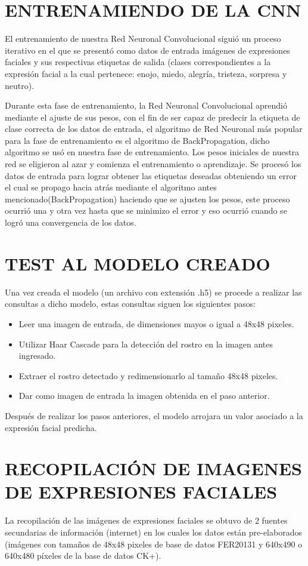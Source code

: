 \section{ENTRENAMIENDO DE LA CNN}
El entrenamiento de nuestra Red Neuronal Convolucional siguió un proceso
iterativo en el que se presentó como datos de entrada imágenes de expresiones faciales y
sus respectivas etiquetas de salida (clases correspondientes a la expresión facial a la cual
pertenece: enojo, miedo, alegría, tristeza, sorpresa y neutro).

Durante esta fase de entrenamiento, la Red Neuronal Convolucional aprendió
mediante el ajuste de sus pesos, con el fin de ser capaz de predecir la etiqueta de clase
correcta de los datos de entrada, el algoritmo de Red Neuronal más popular para la fase
de entrenamiento es el algoritmo de BackPropagation, dicho algoritmo se usó en nuestra
fase de entrenamiento. Los pesos iniciales de nuestra red se eligieron al azar y comienza
el entrenamiento o aprendizaje. Se procesó los datos de entrada para lograr obtener las
etiquetas deseadas obteniendo un error el cual se propago hacia atrás mediante el
algoritmo antes mencionado(BackPropagation) haciendo que se ajusten los pesos, este
proceso ocurrió una y otra vez hasta que se minimizo el error y eso ocurrió cuando se
logró una convergencia de los datos.

\section{TEST AL MODELO CREADO}
Una vez creada el modelo (un archivo con extensión .h5) se procede a realizar las
consultas a dicho modelo, estas consultas siguen los siguientes pasos:

\begin{itemize}
\item Leer una imagen de entrada, de dimensiones mayos o igual a 48x48 pixeles.
\item Utilizar Haar Cascade para la detección del rostro en la imagen antes ingresado.
\item Extraer el rostro detectado y redimensionarlo al tamaño 48x48 pixeles.
\item Dar como imagen de entrada la imagen obtenida en el paso anterior.
\end{itemize}
Después de realizar los pasos anteriores, el modelo arrojara un valor asociado a la
expresión facial predicha.

\section{RECOPILACIÓN DE IMAGENES DE EXPRESIONES
FACIALES}
La recopilación de las imágenes de expresiones faciales se obtuvo de 2 fuentes
secundarias de información (internet) en los cuales los datos están pre-elaborados
(imágenes con tamaños de 48x48 pixeles de base de datos FER20131 y 640x490 o
640x480 píxeles de la base de datos CK+).

